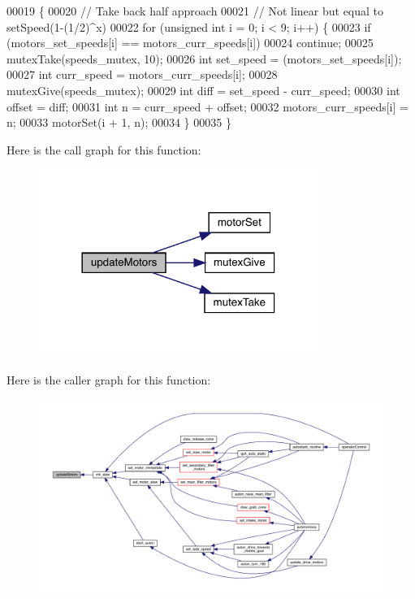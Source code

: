 \begin{DoxyCode}
00019                     \{
00020   \textcolor{comment}{// Take back half approach}
00021   \textcolor{comment}{// Not linear but equal to setSpeed(1-(1/2)^x)}
00022   \textcolor{keywordflow}{for} (\textcolor{keywordtype}{unsigned} \textcolor{keywordtype}{int} i = 0; i < 9; i++) \{
00023     \textcolor{keywordflow}{if} (motors_set_speeds[i] == motors_curr_speeds[i])
00024       \textcolor{keywordflow}{continue};
00025     mutexTake(speeds_mutex, 10);
00026     \textcolor{keywordtype}{int} set\_speed = (motors_set_speeds[i]);
00027     \textcolor{keywordtype}{int} curr\_speed = motors_curr_speeds[i];
00028     mutexGive(speeds_mutex);
00029     \textcolor{keywordtype}{int} diff = set\_speed - curr\_speed;
00030     \textcolor{keywordtype}{int} offset = diff;
00031     \textcolor{keywordtype}{int} n = curr\_speed + offset;
00032     motors_curr_speeds[i] = n;
00033     motorSet(i + 1, n);
00034   \}
00035 \}
\end{DoxyCode}
Here is the call graph for this function\+:
\nopagebreak
\begin{figure}[H]
\begin{center}
\leavevmode
\includegraphics[width=258pt]{slew_8h_a807a87c5df438fde21c1e8213906695b_cgraph}
\end{center}
\end{figure}
Here is the caller graph for this function\+:
\nopagebreak
\begin{figure}[H]
\begin{center}
\leavevmode
\includegraphics[width=350pt]{slew_8h_a807a87c5df438fde21c1e8213906695b_icgraph}
\end{center}
\end{figure}
